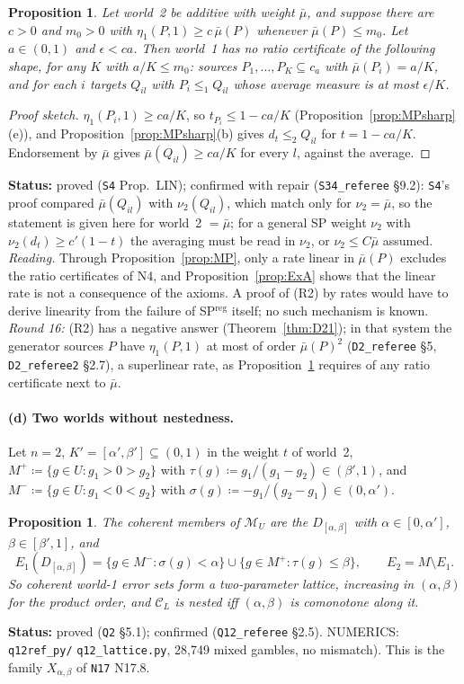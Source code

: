 \documentclass[11pt]{article}
\newtheorem{proposition}[theorem]{Proposition}
\theoremstyle{definition}
\theoremstyle{remark}
\newcommand{\M}{\mathcal M}
\newcommand{\C}{\mathcal C}
\newcommand{\src}[1]{\texttt{#1}}
\newcommand{\status}[1]{\par\smallskip\noindent\textbf{Status:} #1\par\smallskip}
\begin{document}
\begin{proposition}\label{prop:LIN}
Let world~2 be additive with weight $\bar\mu$, and suppose there are $c>0$ and $m_0>0$ with $\eta_1(P,1)\ge c\,\bar\mu(P)$ whenever $\bar\mu(P)\le m_0$. Let $a\in(0,1)$ and $\epsilon<ca$. Then world~1 has no ratio certificate of the following shape, for any $K$ with $a/K\le m_0$: sources $P_1,\dots,P_K\subseteq c_a$ with $\bar\mu(P_i)=a/K$, and for each $i$ targets $Q_{il}$ with $P_i\le_1Q_{il}$ whose average measure is at most $\epsilon/K$.
\end{proposition}
\begin{proof}[Proof sketch]
$\eta_1(P_i,1)\ge ca/K$, so $t_{P_i}\le1-ca/K$ (Proposition~\ref{prop:MPsharp}(e)), and Proposition~\ref{prop:MPsharp}(b) gives $d_t\le_2Q_{il}$ for $t=1-ca/K$. Endorsement by $\bar\mu$ gives $\bar\mu(Q_{il})\ge ca/K$ for every $l$, against the average.
\end{proof}
\status{proved (\src{S4} Prop.~LIN); confirmed with repair (\src{S34\_referee} \S9.2): \src{S4}'s proof compared $\bar\mu(Q_{il})$ with $\nu_2(Q_{il})$, which match only for $\nu_2=\bar\mu$, so the statement is given here for world~2 $=\bar\mu$; for a general SP weight $\nu_2$ with $\nu_2(d_t)\ge c'(1-t)$ the averaging must be read in $\nu_2$, or $\nu_2\le C\bar\mu$ assumed. \emph{Reading.} Through Proposition~\ref{prop:MP}, only a rate linear in $\bar\mu(P)$ excludes the ratio certificates of N4, and Proposition~\ref{prop:ExA} shows that the linear rate is not a consequence of the axioms. A proof of (R2) by rates would have to derive linearity from the failure of SP$^{\mathrm{reg}}$ itself; no such mechanism is known. \emph{Round 16:} (R2) has a negative answer (Theorem~\ref{thm:D21}); in that system the generator sources $P$ have $\eta_1(P,1)$ at most of order $\bar\mu(P)^2$ (\src{D2\_referee} \S5, \src{D2\_referee2} \S2.7), a superlinear rate, as Proposition~\ref{prop:LIN} requires of any ratio certificate next to $\bar\mu$.}

\paragraph{(d) Two worlds without nestedness.} Let $n=2$, $K'=[\alpha',\beta']\subseteq(0,1)$ in the weight $t$ of world~2, $M^+\coloneqq\{g\in U:g_1>0>g_2\}$ with $\tau(g)\coloneqq g_1/(g_1-g_2)\in(\beta',1)$, and $M^-\coloneqq\{g\in U:g_1<0<g_2\}$ with $\sigma(g)\coloneqq-g_1/(g_2-g_1)\in(0,\alpha')$.

\begin{proposition}\label{prop:lattice}
The coherent members of $\M_U$ are the $D_{[\alpha,\beta]}$ with $\alpha\in[0,\alpha']$, $\beta\in[\beta',1]$, and
\[
E_1(D_{[\alpha,\beta]})=\{g\in M^-:\sigma(g)<\alpha\}\cup\{g\in M^+:\tau(g)\le\beta\},\qquad E_2=M\setminus E_1 .
\]
So coherent world-1 error sets form a two-parameter lattice, increasing in $(\alpha,\beta)$ for the product order, and $\C_L$ is nested iff $(\alpha,\beta)$ is comonotone along it.
\end{proposition}
\status{proved (\src{Q2} \S5.1); confirmed (\src{Q12\_referee} \S2.5). NUMERICS: \src{q12ref\_py/} \src{q12\_lattice.py}, 28{,}749 mixed gambles, no mismatch). This is the family $X_{\alpha,\beta}$ of \src{N17} N17.8.}
\end{document}
